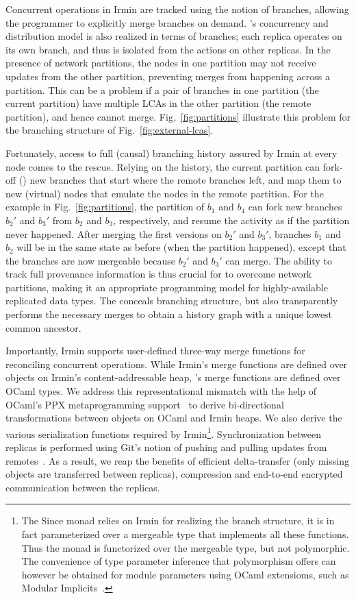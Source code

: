 Concurrent operations in Irmin are tracked using the notion of
branches, allowing the programmer to explicitly merge branches on
demand. \name's concurrency and distribution model is also realized in
terms of branches; each replica operates on its own branch, and thus
is isolated from the actions on other replicas. In the presence of
network partitions, the nodes in one partition may not receive updates
from the other partition, preventing merges from happening across a
partition. This can be a problem if a pair of branches in one
partition (the current partition) have multiple LCAs in the other
partition (the remote partition), and hence cannot
merge. Fig.~\ref{fig:partitions} illustrate this problem for the
branching structure of Fig.~\ref{fig:external-lcas}.

Fortunately, access to full (causal) branching history assured by
Irmin at every node comes to the rescue. Relying on the history, the
current partition can fork-off () new branches that start
where the remote branches left, and map them to new (virtual) nodes
that emulate the nodes in the remote partition. For the example in
Fig.~\ref{fig:partitions}, the partition of $b_1$ and $b_4$ can fork
new branches $b_2'$ and $b_3'$ from $b_2$ and $b_3$, respectively, and
resume the activity as if the partition never happened. After merging
the first versions on $b_2'$ and $b_3'$, branches $b_1$ and $b_2$ will
be in the same state as before (when the partition happened), except
that the branches are now mergeable because $b_2'$ and $b_3'$ can
merge. The ability to track full provenance information is thus
crucial for \name to overcome network partitions, making it an
appropriate programming model for highly-available replicated data
types. The \nameMonad conceals branching structure, but also
transparently performs the necessary merges to obtain a history graph
with a unique lowest common ancestor.

Importantly, Irmin supports user-defined three-way merge functions for
reconciling concurrent operations. While Irmin's merge functions are
defined over objects on Irmin's content-addressable heap, \name's
merge functions are defined over OCaml types. We address this
representational mismatch with the help of OCaml's PPX metaprogramming
support~\cite{ppx} to derive bi-directional transformations between
objects on OCaml and Irmin heaps. We also derive the various
serialization functions required by Irmin\footnote{
  The Since \nameMonad monad relies on Irmin for realizing the branch
  structure, it is in fact parameterized over a mergeable type that
  implements all these functions. Thus the monad is functorized over
  the mergeable type, but not polymorphic. The convenience of type
  parameter inference that polymorphism offers can however be obtained
  for module parameters using OCaml extensioms, such as Modular
  Implicits~\cite{implicits}.
}.
Synchronization between replicas is performed using Git's notion of
pushing and pulling updates from remotes~\cite{git-tp}. As a result, we reap the
benefits of efficient delta-transfer (only missing objects are transferred between
replicas), compression and end-to-end encrypted communication between
the replicas.
